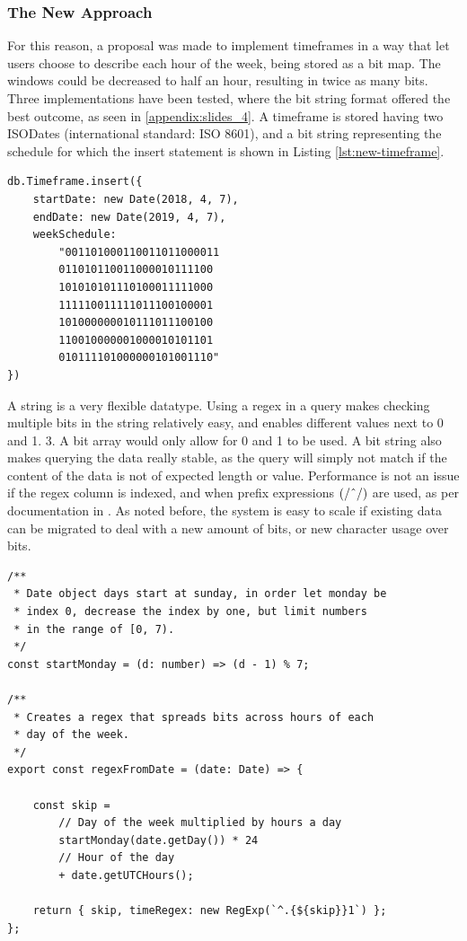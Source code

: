 \subsubsection{The New Approach}
For this reason, a proposal was made to implement timeframes in a way that let users choose to describe each hour of the week, being stored as a bit map. The windows could be decreased to half an hour, resulting in twice as many bits. Three implementations have been tested, where the bit string format offered the best outcome, as seen in \ref{appendix:slides_4}. A timeframe is stored having two ISODates (international standard: ISO 8601), and a bit string representing the schedule for which the insert statement is shown in Listing \ref{lst:new-timeframe}.

\begin{center}
	\noindent\begin{minipage}{.45\textwidth}
		\begin{lstlisting}[caption={Improved timeframe.}, label={lst:new-timeframe}]
db.Timeframe.insert({
	startDate: new Date(2018, 4, 7),
	endDate: new Date(2019, 4, 7),
	weekSchedule:
		"001101000110011011000011
		011010110011000010111100
		101010101110100011111000
		111110011111011100100001
		101000000010111011100100
		110010000001000010101101
		010111101000000101001110"
})
\end{lstlisting}
	\end{minipage}
\end{center}

A string is a very flexible datatype. Using a regex in a query makes checking multiple bits in the string relatively easy, and enables different values next to 0 and 1. 3. A bit array would only allow for 0 and 1 to be used. A bit string also makes querying the data really stable, as the query will simply not match if the content of the data is not of expected length or value. Performance is not an issue if the regex column is indexed, and when prefix expressions $(/\string^/)$ are used, as per documentation in \cite{MongoDB-Regex}. As noted before, the system is easy to scale if existing data can be migrated to deal with a new amount of bits, or new character usage over bits.

\begin{lstlisting}[caption={Opening timeframe.}, label={lst:open-timeframe}]
/**
 * Date object days start at sunday, in order let monday be
 * index 0, decrease the index by one, but limit numbers
 * in the range of [0, 7).
 */
const startMonday = (d: number) => (d - 1) % 7;

/**
 * Creates a regex that spreads bits across hours of each
 * day of the week.
 */
export const regexFromDate = (date: Date) => {

	const skip =
		// Day of the week multiplied by hours a day
		startMonday(date.getDay()) * 24
		// Hour of the day
		+ date.getUTCHours();

	return { skip, timeRegex: new RegExp(`^.{${skip}}1`) };
};
\end{lstlisting}

